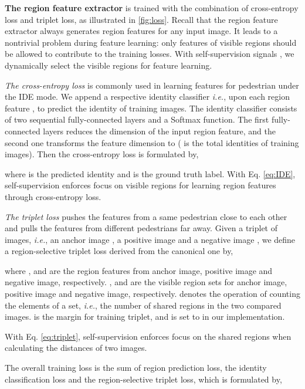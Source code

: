 \documentclass[10pt,twocolumn,letterpaper]{article}
\begin{document}
\textbf{The region feature extractor} is trained with the combination of cross-entropy loss and triplet loss, as illustrated in \ref{fig:loss}.
 Recall that the region feature extractor always generates  region features for any input image. It leads to a nontrivial problem during feature learning: only features of visible regions should be allowed to contribute to the training losses. With self-supervision signals , we dynamically select the visible regions for feature learning.   

\emph{The cross-entropy loss} is commonly used in learning features for pedestrian under the IDE \cite{zheng2016mars} mode. We append a respective identity classifier \emph{i.e.},  upon each region feature , to predict the identity of training images. The identity classifier consists of two sequential fully-connected layers and a Softmax function. The first fully-connected layers reduces the dimension of the input region feature, and the second one transforms the feature dimension to  ( is the total identities of training images).  Then the cross-entropy loss is formulated by,

where  is the predicted identity and  is the ground truth label. With Eq. \ref{eq:IDE}, self-supervision enforces focus on visible regions for learning region features through cross-entropy loss. 




\emph{The triplet loss} pushes the features from a same pedestrian close to each other and pulls the features from different pedestrians far away. 
Given a triplet of images, \emph{i.e.}, an anchor image , a positive image  and a negative image , we define a region-selective triplet loss derived from the canonical one by, 



where ,  and  are the region features from anchor image, positive image and negative image, respectively. ,  and  are the visible region sets for anchor image, positive image and negative image, respectively.  denotes the operation of counting the elements of a set, \emph{i.e.}, the number of shared regions in the two compared images.  is the margin for training triplet, and is set to  in our implementation.

With Eq. \ref{eq:triplet}, self-supervision enforces focus on the shared regions when calculating the distances of two images. 

The overall training loss is the sum of region prediction loss, the identity classification loss and the region-selective triplet loss, which is formulated by,
\end{document}
